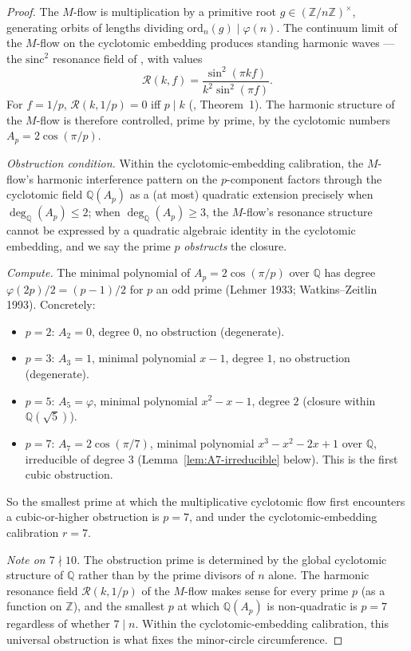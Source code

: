 \documentclass[11pt,reqno]{amsart}
\theoremstyle{plain}
\theoremstyle{definition}
\newcommand{\Z}{\mathbb{Z}}
\newcommand{\Q}{\mathbb{Q}}
\newcommand{\Zns}{(\Z/n\Z)^{\times}}
\newcommand{\sinc}{\mathrm{sinc}}
\newcommand{\ord}{\mathrm{ord}}
\begin{document}
\begin{proof}
The $M$-flow is multiplication by a primitive root $g \in \Zns$, generating orbits of lengths dividing $\ord_n(g) \mid \varphi(n)$. The continuum limit of the $M$-flow on the cyclotomic embedding produces standing harmonic waves --- the $\sinc^2$ resonance field of \cite{SandersGish-FirstG}, with values
\[
\mathcal{R}(k, f) = \frac{\sin^2(\pi k f)}{k^2 \sin^2(\pi f)}.
\]
For $f = 1/p$, $\mathcal{R}(k, 1/p) = 0$ iff $p \mid k$ (\cite{SandersGish-FirstG}, Theorem~1). The harmonic structure of the $M$-flow is therefore controlled, prime by prime, by the cyclotomic numbers $A_p = 2\cos(\pi/p)$.

\emph{Obstruction condition.} Within the cyclotomic-embedding calibration, the $M$-flow's harmonic interference pattern on the $p$-component factors through the cyclotomic field $\Q(A_p)$ as a (at most) quadratic extension precisely when $\deg_{\Q}(A_p) \le 2$; when $\deg_{\Q}(A_p) \ge 3$, the $M$-flow's resonance structure cannot be expressed by a quadratic algebraic identity in the cyclotomic embedding, and we say the prime $p$ \emph{obstructs} the closure.

\emph{Compute.} The minimal polynomial of $A_p = 2\cos(\pi/p)$ over $\Q$ has degree $\varphi(2p)/2 = (p-1)/2$ for $p$ an odd prime (Lehmer 1933; Watkins--Zeitlin 1993). Concretely:
\begin{itemize}
\item $p = 2$: $A_2 = 0$, degree $0$, no obstruction (degenerate).
\item $p = 3$: $A_3 = 1$, minimal polynomial $x - 1$, degree $1$, no obstruction (degenerate).
\item $p = 5$: $A_5 = \varphi$, minimal polynomial $x^2 - x - 1$, degree $2$ (closure within $\Q(\sqrt 5)$).
\item $p = 7$: $A_7 = 2 \cos(\pi/7)$, minimal polynomial $x^3 - x^2 - 2x + 1$ over $\Q$, irreducible of degree $3$ (Lemma~\ref{lem:A7-irreducible} below). This is the first cubic obstruction.
\end{itemize}

So the smallest prime at which the multiplicative cyclotomic flow first encounters a cubic-or-higher obstruction is $p = 7$, and under the cyclotomic-embedding calibration $r = 7$.

\emph{Note on $7 \nmid 10$.} The obstruction prime is determined by the global cyclotomic structure of $\Q$ rather than by the prime divisors of $n$ alone. The harmonic resonance field $\mathcal{R}(k, 1/p)$ of the $M$-flow makes sense for every prime $p$ (as a function on $\Z$), and the smallest $p$ at which $\Q(A_p)$ is non-quadratic is $p = 7$ regardless of whether $7 \mid n$. Within the cyclotomic-embedding calibration, this universal obstruction is what fixes the minor-circle circumference.
\end{proof}
\end{document}
